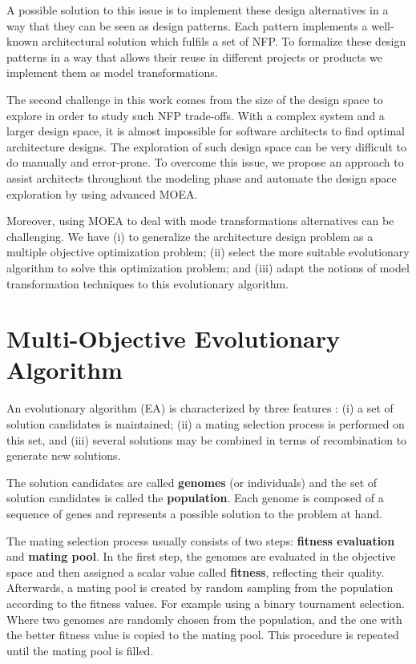 \documentclass[conference]{IEEEtran}
\begin{document}
A possible solution to this issue is to implement these design alternatives in a way that they can be seen as design patterns. Each pattern implements a well-known architectural solution which fulfils a set of NFP. To formalize these design patterns in a way that allows their reuse in different projects or products we implement them as model transformations.

The second challenge in this work comes from the size of the design space to explore in order to study such NFP trade-offs. With a complex system and a larger design space, it is almost impossible for software architects to find optimal architecture designs. The exploration of such design space can be very difficult to do manually and error-prone. To overcome this issue, we propose an approach to assist architects throughout the modeling phase and automate the design space exploration by using advanced MOEA.

Moreover, using MOEA to deal with mode transformations alternatives can be challenging. We have (i) to generalize the architecture design problem as a multiple objective optimization problem; (ii) select the more suitable evolutionary algorithm to solve this optimization problem; and (iii) adapt the notions of model transformation techniques to this evolutionary algorithm.

\section{Multi-Objective Evolutionary Algorithm}

An evolutionary algorithm (EA) is characterized by three features : (i) a set of solution candidates is maintained; (ii) a mating selection process is performed on this set, and (iii) several solutions may be combined in terms of recombination to generate new solutions.

The solution candidates are called \textbf{genomes} (or individuals) and the set of solution candidates is called the \textbf{population}. Each genome is composed of a sequence of genes and represents a possible solution to the problem at hand.

The mating selection process usually consists of two steps: \textbf{fitness evaluation} and \textbf{mating pool}. In the first step, the genomes are evaluated in the objective space and then assigned a scalar value called \textbf{fitness}, reflecting their quality. Afterwards, a mating pool is created by random sampling from the population according to the fitness values. For example using a binary tournament selection. Where two genomes are randomly chosen from the population, and the one with the better fitness value is copied to the mating pool. This procedure is repeated until the mating pool is filled.
\end{document}
